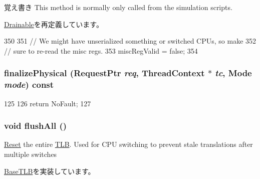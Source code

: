 \begin{DoxyNote}{覚え書き}
This method is normally only called from the simulation scripts. 
\end{DoxyNote}


\hyperlink{classDrainable_a8f020d3237536fe007fc488c4125c5d8}{Drainable}を再定義しています。


\begin{DoxyCode}
350 {
351     // We might have unserialized something or switched CPUs, so make
352     // sure to re-read the misc regs.
353     miscRegValid = false;
354 }
\end{DoxyCode}
\hypertarget{classArmISA_1_1TLB_ae199d95c42e036851a8a0543c6d6d2e3}{
\subsubsection[{finalizePhysical}]{ finalizePhysical ({\bf RequestPtr} {\em req}, \/  {\bf ThreadContext} $\ast$ {\em tc}, \/  {\bf Mode} {\em mode}) const}}
\label{classArmISA_1_1TLB_ae199d95c42e036851a8a0543c6d6d2e3}



\begin{DoxyCode}
125 {
126     return NoFault;
127 }
\end{DoxyCode}
\hypertarget{classArmISA_1_1TLB_aca1483a67aee5a91e442f7131d66bcbd}{
\subsubsection[{flushAll}]{\setlength{\rightskip}{0pt plus 5cm}void flushAll ()}}
\label{classArmISA_1_1TLB_aca1483a67aee5a91e442f7131d66bcbd}
\hyperlink{classArmISA_1_1Reset}{Reset} the entire \hyperlink{classArmISA_1_1TLB}{TLB}. Used for CPU switching to prevent stale translations after multiple switches 

\hyperlink{classBaseTLB_a5958bc92949a47d1be1088468abdc006}{BaseTLB}を実装しています。


